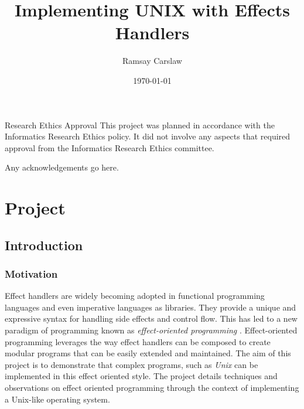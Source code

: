 \documentclass[logo,bsc,singlespacing,parskip]{infthesis}
\begin{document}
\begin{preliminary}

\title{Implementing UNIX with Effects Handlers}
\author{Ramsay Carslaw}


\date{\today}


\maketitle

\newenvironment{ethics}
   {\begin{frontenv}{Research Ethics Approval}{\LARGE}}
   {\end{frontenv}\newpage}

\begin{ethics}
This project was planned in accordance with the Informatics Research
Ethics policy. It did not involve any aspects that required approval
from the Informatics Research Ethics committee.

\standarddeclaration
\end{ethics}

\begin{acknowledgements}
  Any acknowledgements go here.
\end{acknowledgements}

\tableofcontents

\end{preliminary}

\part{Project}

\chapter{Introduction}

\section{Motivation}

Effect handlers \cite{plotkin2002computational} are widely becoming adopted in
functional programming languages \cite{DBLP:journals/corr/Leijen14} and even
imperative languages as libraries. They provide a unique and expressive syntax
for handling side effects and control flow. This has led to a new paradigm of
programming known as \emph{effect-oriented programming}
\cite{pretnar2015introduction}. Effect-oriented programming leverages the way
effect handlers can be composed to create modular programs that can be easily
extended and maintained. The aim of this project is to demonstrate that complex
programs, such as \emph{Unix} \cite{ritchie1978unix} can be implemented in this
effect oriented style. The project details techniques and observations on
effect oriented programming through the context of implementing a Unix-like
operating system.
\end{document}
